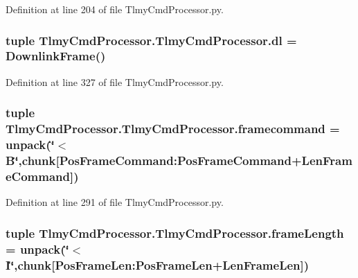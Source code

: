 Definition at line 204 of file Tlmy\+Cmd\+Processor.\+py.

\hypertarget{namespace_tlmy_cmd_processor_1_1_tlmy_cmd_processor_a2703f38cf5bdc1ca5f19eeca336145ae}{}
\subsubsection[{dl}]{\setlength{\rightskip}{0pt plus 5cm}tuple Tlmy\+Cmd\+Processor.\+Tlmy\+Cmd\+Processor.\+dl = {\bf Downlink\+Frame}()}\label{namespace_tlmy_cmd_processor_1_1_tlmy_cmd_processor_a2703f38cf5bdc1ca5f19eeca336145ae}


Definition at line 327 of file Tlmy\+Cmd\+Processor.\+py.

\hypertarget{namespace_tlmy_cmd_processor_1_1_tlmy_cmd_processor_acf404d27b5f133da140197499acc28e0}{}
\subsubsection[{framecommand}]{\setlength{\rightskip}{0pt plus 5cm}tuple Tlmy\+Cmd\+Processor.\+Tlmy\+Cmd\+Processor.\+framecommand = unpack(\char`\"{}$<$B\char`\"{},chunk\mbox{[}Pos\+Frame\+Command\+:\+Pos\+Frame\+Command+{\bf Len\+Frame\+Command}\mbox{]})}\label{namespace_tlmy_cmd_processor_1_1_tlmy_cmd_processor_acf404d27b5f133da140197499acc28e0}


Definition at line 291 of file Tlmy\+Cmd\+Processor.\+py.

\hypertarget{namespace_tlmy_cmd_processor_1_1_tlmy_cmd_processor_a6fd23321acd4d3b684cf5982e2ef65e1}{}
\subsubsection[{frame\+Length}]{\setlength{\rightskip}{0pt plus 5cm}tuple Tlmy\+Cmd\+Processor.\+Tlmy\+Cmd\+Processor.\+frame\+Length = unpack(\char`\"{}$<$I\char`\"{},chunk\mbox{[}Pos\+Frame\+Len\+:\+Pos\+Frame\+Len+{\bf Len\+Frame\+Len}\mbox{]})}\label{namespace_tlmy_cmd_processor_1_1_tlmy_cmd_processor_a6fd23321acd4d3b684cf5982e2ef65e1}


